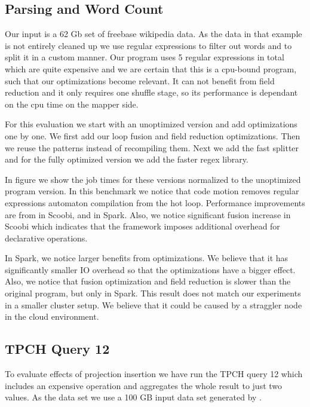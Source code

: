 \subsection{Parsing and Word Count}
\label{subsec:parsing-word-count}
Our input is a 62 Gb set of freebase wikipedia data. As the data in that example is not entirely cleaned up we use regular expressions to filter out words and to split it in a custom manner. Our program uses 5 regular expressions in total which are quite expensive and we are certain that this is a cpu-bound program, such that our optimizations become relevant.
It can not benefit from field reduction and it only requires one shuffle stage, so its performance is dependant on the cpu time on the mapper side. 

For this evaluation we start with an unoptimized version and add optimizations one by one. We first add our loop fusion and field reduction optimizations. Then we reuse the patterns instead of recompiling them. Next we add the fast splitter and for the fully optimized version we add the faster regex library. 

In figure \todo{\ref{}} we show the job times for these versions normalized to the unoptimized program version. In this benchmark we notice that code motion removes regular expressions automaton compilation from the hot loop. Performance improvements are from  in Scoobi,  and in Spark. Also, we notice significant fusion increase in Scoobi which indicates that the framework imposes additional overhead for declarative operations. 

In Spark, we notice larger benefits from optimizations. We believe that it has significantly smaller IO overhead so that the optimizations have a bigger effect. Also, we notice that fusion optimization and field reduction is slower than the original program, but only in Spark. This result does not match our experiments in a smaller cluster setup. We believe that it could be caused by a straggler node in the cloud environment.

\subsection{TPCH Query 12}
\label{subsec:tpch-query-12}

To evaluate effects of projection insertion we have run the TPCH query 12 which includes an expensive  operation and aggregates the whole result to just two values. As the data set we use a 100 GB input data set generated by .

